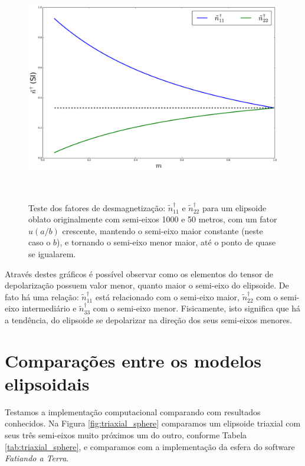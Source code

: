 \begin{figure}[hbt!]
	\centering \includegraphics[width=15cm,height=10cm]{figures/test_n_oblate}
	\caption[Teste dos fatores de desmagnetização para um elipsoide oblato.]{Teste dos fatores de desmagnetização:
		$\tilde{n}^{\dagger}_{11}$ e $\tilde{n}^{\dagger}_{22}$
		para um elipsoide oblato originalmente com semi-eixos 1000 e 50 metros, com um fator $u (a/b)$ crescente,
		mantendo o semi-eixo maior constante (neste caso o $b$), e tornando o semi-eixo menor maior, até o ponto de
		quase se igualarem.}
	\label{fig:n_oblato}
\end{figure}

Através destes gráficos é possível observar como os elementos do tensor de depolarização possuem valor menor, quanto maior o semi-eixo do elipsoide. De fato há uma relação: $\tilde{n}^{\dagger}_{11}$ está relacionado com o semi-eixo maior, $\tilde{n}^{\dagger}_{22}$ com o semi-eixo intermediário e $\tilde{n}^{\dagger}_{33}$ com o semi-eixo menor. Fisicamente, isto significa que há a tendência, do elipsoide se depolarizar na direção dos seus semi-eixos menores.

\section{Comparações entre os modelos elipsoidais}

Testamos a implementação computacional comparando com resultados conhecidos. Na Figura \ref{fig:triaxial_sphere} comparamos um elipsoide triaxial com seus três semi-eixos muito próximos um do outro, conforme Tabela \ref{tab:triaxial_sphere}, e comparamos com a implementação da esfera do software \textit{Fatiando a Terra}.

